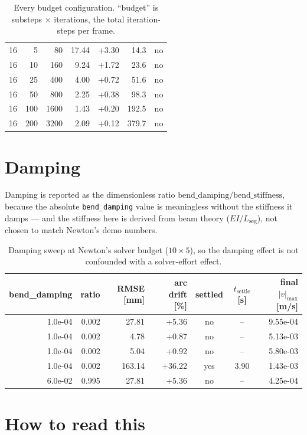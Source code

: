 \documentclass[11pt,a4paper]{article}
\begin{document}
\begin{table}[htbp]
\begin{tabular}{rrrrrrc}
    16 & 5 & 80 & 17.44 & +3.30 & 14.3 & no \\
    16 & 10 & 160 & 9.24 & +1.72 & 23.6 & no \\
    16 & 25 & 400 & 4.00 & +0.72 & 51.6 & no \\
    16 & 50 & 800 & 2.25 & +0.38 & 98.3 & no \\
    16 & 100 & 1600 & 1.43 & +0.20 & 192.5 & no \\
    16 & 200 & 3200 & 2.09 & +0.12 & 379.7 & no \\
\bottomrule
\end{tabular}
\caption{Every budget configuration. ``budget'' is
substeps $\times$ iterations, the total iteration-steps per frame.}
\end{table}

\section{Damping}

Damping is reported as the dimensionless ratio
$\text{bend\_damping}/\text{bend\_stiffness}$, because the absolute
\texttt{bend\_damping} value is meaningless without the stiffness it damps ---
and the stiffness here is derived from beam theory ($EI/L_{\text{seg}}$),
not chosen to match Newton's demo numbers.

\begin{table}[htbp]
\centering
\small
\begin{tabular}{rrrrccr}
\toprule
bend\_damping & ratio & RMSE [mm] & arc drift [\%] & settled & $t_{\text{settle}}$ [s] & final $|v|_{\max}$ [m/s] \\
\midrule
    1.0e-04 & 0.002 & 27.81 & +5.36 & no & -- & 9.55e-04 \\
    1.0e-04 & 0.002 & 4.78 & +0.87 & no & -- & 5.13e-03 \\
    1.0e-04 & 0.002 & 5.04 & +0.92 & no & -- & 5.80e-03 \\
    1.0e-04 & 0.002 & 163.14 & +36.22 & yes & 3.90 & 1.43e-03 \\
    6.0e-02 & 0.995 & 27.81 & +5.36 & no & -- & 4.25e-04 \\
\bottomrule
\end{tabular}
\caption{Damping sweep at Newton's solver budget ($10\times5$), so the damping
effect is not confounded with a solver-effort effect.}
\end{table}

\section{How to read this}
\end{document}
